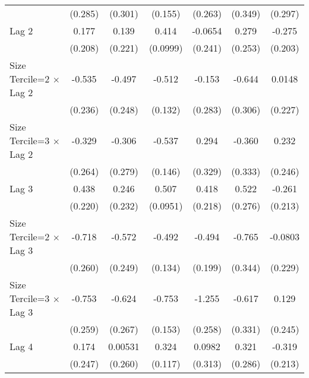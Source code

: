 \begin{table}[htbp]
\begin{tabular}{l*{6}{c}}
                &  (0.285)         &  (0.301)         &  (0.155)         &  (0.263)         &  (0.349)         &  (0.297)         \\
\addlinespace
Lag 2           &    0.177         &    0.139         &    0.414\sym{***}&  -0.0654         &    0.279         &   -0.275         \\
                &  (0.208)         &  (0.221)         & (0.0999)         &  (0.241)         &  (0.253)         &  (0.203)         \\
\addlinespace
Size Tercile=2 $\times$ Lag 2&   -0.535\sym{*}  &   -0.497\sym{*}  &   -0.512\sym{***}&   -0.153         &   -0.644\sym{*}  &   0.0148         \\
                &  (0.236)         &  (0.248)         &  (0.132)         &  (0.283)         &  (0.306)         &  (0.227)         \\
\addlinespace
Size Tercile=3 $\times$ Lag 2&   -0.329         &   -0.306         &   -0.537\sym{***}&    0.294         &   -0.360         &    0.232         \\
                &  (0.264)         &  (0.279)         &  (0.146)         &  (0.329)         &  (0.333)         &  (0.246)         \\
\addlinespace
Lag 3           &    0.438\sym{*}  &    0.246         &    0.507\sym{***}&    0.418         &    0.522         &   -0.261         \\
                &  (0.220)         &  (0.232)         & (0.0951)         &  (0.218)         &  (0.276)         &  (0.213)         \\
\addlinespace
Size Tercile=2 $\times$ Lag 3&   -0.718\sym{**} &   -0.572\sym{*}  &   -0.492\sym{***}&   -0.494\sym{*}  &   -0.765\sym{*}  &  -0.0803         \\
                &  (0.260)         &  (0.249)         &  (0.134)         &  (0.199)         &  (0.344)         &  (0.229)         \\
\addlinespace
Size Tercile=3 $\times$ Lag 3&   -0.753\sym{**} &   -0.624\sym{*}  &   -0.753\sym{***}&   -1.255\sym{***}&   -0.617         &    0.129         \\
                &  (0.259)         &  (0.267)         &  (0.153)         &  (0.258)         &  (0.331)         &  (0.245)         \\
\addlinespace
Lag 4           &    0.174         &  0.00531         &    0.324\sym{**} &   0.0982         &    0.321         &   -0.319         \\
                &  (0.247)         &  (0.260)         &  (0.117)         &  (0.313)         &  (0.286)         &  (0.213)         \\

\end{tabular}
\end{table}
